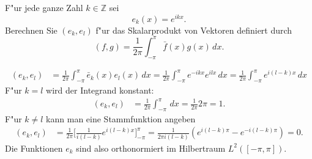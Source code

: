 F"ur jede ganze Zahl $k\in\mathbb Z$ sei
\[
e_k(x)=e^{ikx}.
\]
Berechnen Sie  $(e_k,e_l)$ f"ur das Skalarprodukt von Vektoren definiert
durch
\[
(f,g)=\frac1{2\pi}\int_{-\pi}^{\pi}\bar f(x)g(x)\,dx.
\]

\begin{loesung}
\begin{align*}
(e_k,e_l)
&=
\frac1{2\pi}\int_{-\pi}^{\pi} \bar e_k(x)e_l(x)\,dx
=
\frac1{2\pi}\int_{-\pi}^{\pi} e^{-ikx}e^{ilx} \,dx
=
\frac1{2\pi}\int_{-\pi}^{\pi} e^{i(l-k)x} \,dx
\end{align*}
F"ur $k=l$ wird der Integrand konstant:
\begin{align*}
(e_k,e_l)
&=
\frac1{2\pi}\int_{-\pi}^{\pi} \,dx=\frac1{2\pi}2\pi=1.
\end{align*}
F"ur $k\ne l$ kann man eine Stammfunktion angeben
\begin{align*}
(e_k,e_l)
&=
\frac1{2\pi}\biggl[
\frac1{i(l-k)}e^{i(l-k)x}
\biggr]_{-\pi}^\pi
=\frac1{2\pi i(l-k)}(e^{i(l-k)\pi}-e^{-i(l-k)\pi})=0.
\end{align*}
Die Funktionen $e_k$ sind also orthonormiert im Hilbertraum $L^2([-\pi,\pi])$.
\end{loesung}

